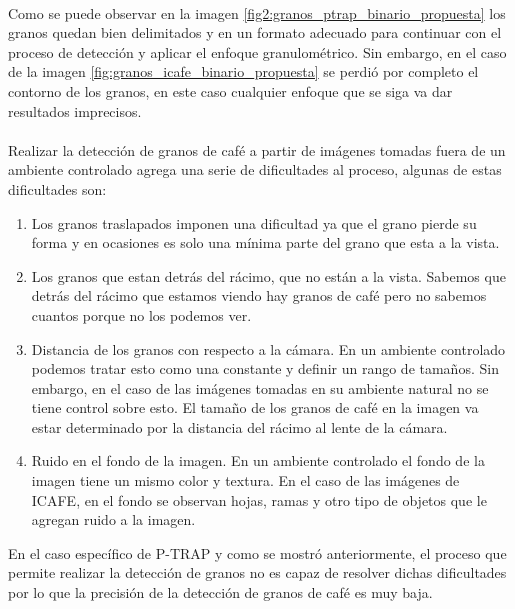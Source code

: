 \\
Como se puede observar en la imagen \ref{fig2:granos_ptrap_binario_propuesta} los granos quedan bien delimitados y en un formato adecuado para continuar con el proceso de detecci\'on y aplicar el enfoque granulom\'etrico. Sin embargo, en el caso de la imagen  \ref{fig:granos_icafe_binario_propuesta} se perdi\'o por completo el contorno de los granos, en este caso cualquier enfoque que se siga va dar resultados imprecisos.
\\\\
Realizar la detecci\'on de granos de caf\'e a partir de im\'agenes tomadas fuera de un ambiente controlado agrega una serie de dificultades al proceso, algunas de estas dificultades son:
\begin{enumerate}
    \item Los granos traslapados imponen una dificultad ya que el grano pierde su forma y en ocasiones es solo una m\'inima parte del grano que esta a la vista.
    \item Los granos que estan detr\'as del r\'acimo, que no est\'an a la vista. Sabemos que detr\'as del r\'acimo que estamos viendo hay granos de caf\'e pero no sabemos cuantos porque no los podemos ver.
    \item Distancia de los granos con respecto a la c\'amara. En un ambiente controlado podemos tratar esto como una constante y definir un rango de tama\~nos. Sin embargo, en el caso de las im\'agenes tomadas en su ambiente natural no se tiene control sobre esto. El tama\~no de los granos de caf\'e en la imagen va estar determinado por la distancia del r\'acimo al lente de la c\'amara.
    \item Ruido en el fondo de la imagen. En un ambiente controlado el fondo de la imagen tiene un mismo color y textura. En el caso de las im\'agenes de ICAFE, en el fondo se observan hojas, ramas y otro tipo de objetos que le agregan ruido a la imagen.
\end{enumerate}
En el caso espec\'ifico de P-TRAP y como se mostr\'o anteriormente, el proceso que permite realizar la detecci\'on de granos no es capaz de resolver dichas dificultades por lo que la precisi\'on de la detecci\'on de granos de caf\'e es muy baja. 
